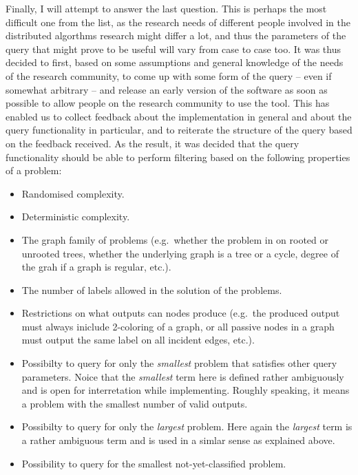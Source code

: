 Finally, I will attempt to answer the last question.
This is perhaps the most difficult one from the list,
as the research needs of different people involved in
the distributed algorthms research might differ a lot, and thus
the parameters of the query that might prove to be useful
will vary from case to case too. It was thus decided to first,
based on some assumptions and general knowledge of the
needs of the research community, to come up with some form of the
query -- even if somewhat arbitrary -- and release an early version
of the software as soon as possible to allow people on the
research community to use the tool. This has enabled us to
collect feedback about the implementation in general and about the
query functionality in particular, and to reiterate the structure of
the query based on the feedback received. As the result, it was
decided that the query functionality should be able to perform
filtering based on the following properties of a problem:

\begin{itemize}
  \item Randomised complexity.
  \item Deterministic complexity.
  \item The graph family of problems (e.g.\ whether the problem in on
  rooted or unrooted trees, whether the underlying graph is a tree
  or a cycle, degree of the grah if a graph is regular, etc.).
  \item The number of labels allowed in the solution of the problems.
  \item Restrictions on what outputs can nodes produce (e.g.\ the
  produced output must always iniclude 2-coloring of a graph,
  or all passive nodes in a graph must output the same
  label on all incident edges, etc.).
  \item Possibilty to query for only the \emph{smallest} problem that
  satisfies other query parameters. Noice that the \emph{smallest} term here is
  defined rather ambiguously and is open for interretation while implementing. Roughly speaking, it means a problem with the smallest
  number of valid outputs.
  \item Possibilty to query for only the \emph{largest} problem. Here again
  the \emph{largest} term is a rather ambiguous term and is used in a simlar sense
  as explained above.
  \item Possibility to query for the smallest not-yet-classified problem.
\end{itemize}
